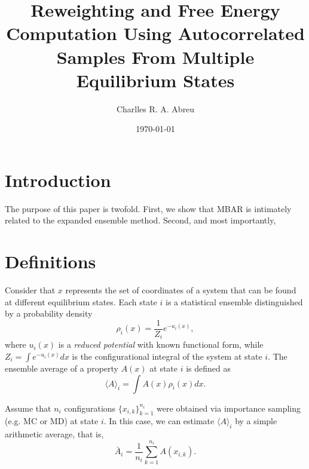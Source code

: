 \documentclass[aip,jcp,reprint,amsmath,amssymb]{revtex4-1}
\begin{document}
\title{Reweighting and Free Energy Computation Using Autocorrelated Samples From Multiple Equilibrium States}

\author{Charlles R. A. Abreu}

\date{\today}

\maketitle

\section{Introduction}
\label{sec:introduction}

The purpose of this paper is twofold. First, we show that MBAR is intimately related to the expanded ensemble method. Second, and most importantly, 

\section{Definitions}
\label{sec:definitions}

Consider that $x$ represents the set of coordinates of a system that can be found at different equilibrium states. Each state $i$ is a statistical ensemble distinguished by a probability density
\begin{equation}
\label{eq:state_prob_density}
\rho_i(x) = \frac{1}{Z_i} e^{-u_i(x)},
\end{equation}
where $u_i(x)$ is a \textit{reduced potential}\cite{Shirts_2008, Chodera_2011} with known functional form, while $Z_i = \int e^{-u_i(x)}dx$ is the configurational integral of the system at state $i$. The ensemble average of a property $A(x)$ at state $i$ is defined as
\begin{equation}
\label{eq:ensemble average}
\langle A \rangle_i = \int A(x)\rho_i(x)dx.
\end{equation}

Assume that $n_i$ configurations $\{x_{i,k}\}_{k=1}^{n_i}$ were obtained via importance sampling\cite{Allen_1987} (e.g. MC or MD) at state $i$. In this case, we can estimate $\langle A \rangle_i$ by a simple arithmetic average, that is,
\begin{equation}
\label{eq:average_estimator}
\bar A_i = \frac{1}{n_i} \sum_{k=1}^{n_i} A(x_{i,k}).
\end{equation}
\end{document}
